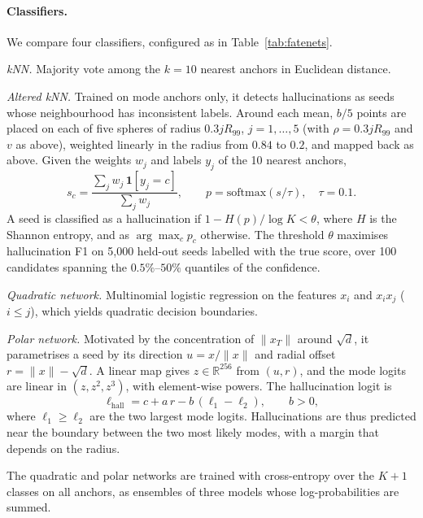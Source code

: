 \documentclass[11pt]{article}
\begin{document}
\paragraph{Classifiers.}
We compare four classifiers, configured as in Table~\ref{tab:fatenets}.

\textit{kNN.} Majority vote among the $k = 10$ nearest anchors in Euclidean distance.

\textit{Altered kNN.} Trained on mode anchors only, it detects hallucinations as seeds whose
neighbourhood has inconsistent labels. Around each mean, $b/5$ points are placed on each of five
spheres of radius $0.3jR_{99}$, $j = 1, \dots, 5$ (with $\rho = 0.3jR_{99}$ and $v$ as above), weighted linearly in the radius from $0.84$ to
$0.2$, and mapped back as above. Given the weights $w_j$ and labels $y_j$ of the 10 nearest anchors,
\begin{equation}
    s_c = \frac{\sum_j w_j \, \mathbf{1}[y_j = c]}{\sum_j w_j}, \qquad
    p = \mathrm{softmax}(s / \tau), \quad \tau = 0.1.
\end{equation}
A seed is classified as a hallucination if $1 - H(p)/\log K < \theta$, where $H$ is the Shannon
entropy, and as $\arg\max_c p_c$ otherwise. The threshold $\theta$ maximises hallucination F1 on
5{,}000 held-out seeds labelled with the true score, over 100 candidates spanning the
$0.5\%$--$50\%$ quantiles of the confidence.

\textit{Quadratic network.} Multinomial logistic regression on the features $x_i$ and
$x_i x_j$ ($i \le j$), which yields quadratic decision boundaries.

\textit{Polar network.} Motivated by the concentration of $\|x_T\|$ around $\sqrt{d}$, it
parametrises a seed by its direction $u = x / \|x\|$ and radial offset $r = \|x\| - \sqrt{d}$.
A linear map gives $z \in \mathbb{R}^{256}$ from $(u, r)$, and the mode logits are linear in
$(z, z^2, z^3)$, with element-wise powers. The hallucination logit is
\begin{equation}
    \ell_{\text{hall}} = c + a\,r - b\,(\ell_1 - \ell_2), \qquad b > 0,
\end{equation}
where $\ell_1 \ge \ell_2$ are the two largest mode logits. Hallucinations are thus predicted near
the boundary between the two most likely modes, with a margin that depends on the radius.

The quadratic and polar networks are trained with cross-entropy over the $K + 1$ classes on all
anchors, as ensembles of three models whose log-probabilities are summed.
\end{document}
